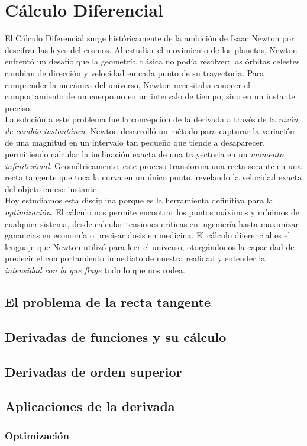 \section{Cálculo Diferencial}

El Cálculo Diferencial surge históricamente de la ambición de Isaac Newton por descifrar las leyes del cosmos. Al estudiar el movimiento de los planetas, Newton enfrentó un desafío que la geometría clásica no podía resolver: las órbitas celestes cambian de dirección y velocidad en cada punto de su trayectoria. Para comprender la mecánica del universo, Newton necesitaba conocer el comportamiento de un cuerpo no en un intervalo de tiempo, sino en un instante preciso.\\

La solución a este problema fue la concepción de la derivada a través de la \emph{razón de cambio instantánea}. Newton desarrolló un método para capturar la variación de una magnitud en un intervalo tan pequeño que tiende a desaparecer, permitiendo calcular la inclinación exacta de una trayectoria en un \emph{momento infinitesimal}. Geométricamente, este proceso transforma una recta secante en una recta tangente que toca la curva en un único punto, revelando la velocidad exacta del objeto en ese instante.\\

Hoy estudiamos esta disciplina porque es la herramienta definitiva para la \emph{optimización}. El cálculo nos permite encontrar los puntos máximos y mínimos de cualquier sistema, desde calcular tensiones críticas en ingeniería hasta maximizar ganancias en economía o precisar dosis en medicina. El cálculo diferencial es el lenguaje que Newton utilizó para leer el universo, otorgándonos la capacidad de predecir el comportamiento inmediato de nuestra realidad y entender la \emph{intensidad con la que fluye} todo lo que nos rodea.

\subsection{El problema de la recta tangente}

\subsection{Derivadas de funciones y su cálculo}

\subsection{Derivadas de orden superior}

\subsection{Aplicaciones de la derivada}

\subsubsection{Optimización}
